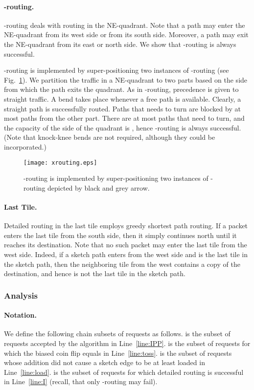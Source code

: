 \documentclass[11pt]{article}
\newenvironment{proof sketch}[1]{\noindent {\emph{Proof sketch of #1:}}}{\hfill \qed}
\begin{document}
\paragraph{-routing.}
-routing deals with routing in the NE-quadrant. Note
that a path may enter the  NE-quadrant from its west side
or from its south side. Moreover, a path may exit the
NE-quadrant from its east or north side. We show that
-routing is always successful.

-routing is implemented by super-positioning two
instances of -routing (see Fig.~\ref{fig:X-routing}). We
partition the traffic in a NE-quadrant to two parts based
on the side from which the path exits the quadrant. As in
-routing, precedence is given to straight traffic.  A
bend takes place whenever a free path is available.
Clearly, a straight path is successfully routed. Paths that
needs to turn are blocked by at most  paths from the
other part. There are at most  paths that need to
turn, and the capacity of the side of the quadrant is
, hence -routing is always successful. (Note that
knock-knee bends are not required, although they could be
incorporated.)

    \begin{figure}[h]
      \centering
        \texttt{[image: xrouting.eps]}
      \caption{-routing is implemented by super-positioning two instances of -routing depicted by black and grey arrow.}
      \label{fig:X-routing}
    \end{figure}

\paragraph{Last Tile.}
Detailed routing in the last tile employs greedy shortest path routing.  If a packet
enters the last tile from the south side, then it simply continues north until it
reaches its destination. Note that no such packet may enter the last tile from the
west side. Indeed, if a sketch path enters  from the west side and  is the last
tile in the sketch path, then the neighboring tile from the west contains a copy of the
destination, and hence  is not the last tile in the sketch path.

\subsubsection{Analysis}

\paragraph{Notation.}
We define the following chain subsets of requests
 as follows.   is the
subset of requests accepted by the  algorithm in
Line~\ref{line:IPP}.  is the subset
of requests for which the biased coin flip  equals 
in Line~\ref{line:toss}.   is the
subset of requests whose addition did not cause a sketch
edge to be at least  loaded in Line~\ref{line:load}.
 is the subset of requests for
which detailed routing is successful in Line~\ref{line:I}
(recall, that only -routing may fail).
\end{document}
